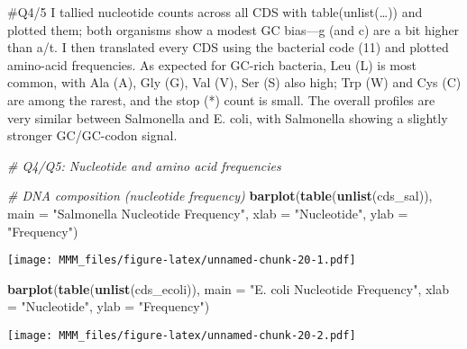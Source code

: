 \documentclass[
]{article}
\newenvironment{Shaded}{\begin{snugshade}}{\end{snugshade}}
\newcommand{\AttributeTok}[1]{\textcolor[rgb]{0.13,0.29,0.53}{#1}}
\newcommand{\CommentTok}[1]{\textcolor[rgb]{0.56,0.35,0.01}{\textit{#1}}}
\newcommand{\FunctionTok}[1]{\textcolor[rgb]{0.13,0.29,0.53}{\textbf{#1}}}
\newcommand{\NormalTok}[1]{#1}
\newcommand{\StringTok}[1]{\textcolor[rgb]{0.31,0.60,0.02}{#1}}
\begin{document}
\#Q4/5 I tallied nucleotide counts across all CDS with
table(unlist(\ldots)) and plotted them; both organisms show a modest GC
bias---g (and c) are a bit higher than a/t. I then translated every CDS
using the bacterial code (11) and plotted amino-acid frequencies. As
expected for GC-rich bacteria, Leu (L) is most common, with Ala (A), Gly
(G), Val (V), Ser (S) also high; Trp (W) and Cys (C) are among the
rarest, and the stop (*) count is small. The overall profiles are very
similar between Salmonella and E. coli, with Salmonella showing a
slightly stronger GC/GC-codon signal.

\begin{Shaded}
\begin{Highlighting}[]
\CommentTok{\# Q4/Q5: Nucleotide and amino acid frequencies}

\CommentTok{\# DNA composition (nucleotide frequency)}
\FunctionTok{barplot}\NormalTok{(}\FunctionTok{table}\NormalTok{(}\FunctionTok{unlist}\NormalTok{(cds\_sal)),}
        \AttributeTok{main =} \StringTok{"Salmonella Nucleotide Frequency"}\NormalTok{,}
        \AttributeTok{xlab =} \StringTok{"Nucleotide"}\NormalTok{, }\AttributeTok{ylab =} \StringTok{"Frequency"}\NormalTok{)}
\end{Highlighting}
\end{Shaded}

\texttt{[image: MMM\_files/figure-latex/unnamed-chunk-20-1.pdf]}

\begin{Shaded}
\begin{Highlighting}[]
\FunctionTok{barplot}\NormalTok{(}\FunctionTok{table}\NormalTok{(}\FunctionTok{unlist}\NormalTok{(cds\_ecoli)),}
        \AttributeTok{main =} \StringTok{"E. coli Nucleotide Frequency"}\NormalTok{,}
        \AttributeTok{xlab =} \StringTok{"Nucleotide"}\NormalTok{, }\AttributeTok{ylab =} \StringTok{"Frequency"}\NormalTok{)}
\end{Highlighting}
\end{Shaded}

\texttt{[image: MMM\_files/figure-latex/unnamed-chunk-20-2.pdf]}
\end{document}
